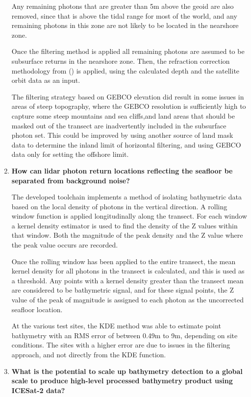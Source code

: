 \begin{enumerate}
    Any remaining photons that are greater than 5m above the geoid are also removed, since that is above the tidal range for most of the world, and any remaining photons in this zone are not likely to be located in the nearshore zone. 

    Once the filtering method is applied all remaining photons are assumed to be subsurface returns in the nearshore zone. Then, the refraction correction methodology from \citeauthor{Parrish2019}(\citeyear{Parrish2019}) is applied, using the calculated depth and the satellite orbit data as an input. 

    The filtering strategy based on GEBCO elevation did result in some issues in areas of steep topography, where the GEBCO resolution is sufficiently high to capture some steep mountains and sea cliffs,and land areas that should be masked out of the transect are inadvertently included in the subsurface photon set. This could be improved by using another source of land mask data to determine the inland limit of horizontal filtering, and using GEBCO data only for setting the offshore limit.

    \item \textbf{How can lidar photon return locations reflecting the seafloor be separated from background noise?}
    
    The developed toolchain implements a method of isolating bathymetric data based on the local density of photons in the vertical direction. A rolling window function is applied longitudinally along the transect. For each window a kernel density estimator is used to find the density of the Z values within that window. Both the magnitude of the peak density and the Z value where the peak value occurs are recorded.    
    
    Once the rolling window has been applied to the entire transect, the mean kernel density for all photons in the transect is calculated, and this is used as a threshold. Any points with a kernel density greater than the transect mean are considered to be bathymetric signal, and for these signal points, the Z value of the peak of magnitude is assigned to each photon as the uncorrected seafloor location. 
    
    At the various test sites, the KDE method was able to estimate point bathymetry with an RMS error of between 0.49m to 9m, depending on site conditions. The sites with a higher error are due to issues in the filtering approach, and not directly from the KDE function.
    \item \textbf{What is the potential to scale up bathymetry detection to a global scale to produce high-level processed bathymetry product using ICESat-2 data? } 
    

\end{enumerate}

